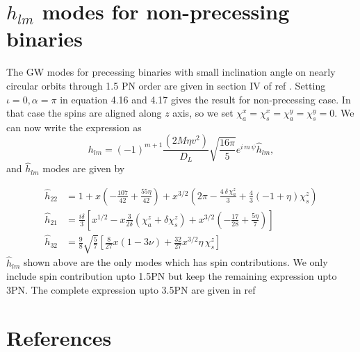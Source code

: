 \documentclass[prd,preprintnumbers,twocolumn,eqsecnum,floatfix,letter]{revtex4}
\begin{document}
\section{$h_{lm}$ modes for non-precessing binaries}\label{Appendix:D}
The GW modes for precessing binaries with small inclination angle on nearly circular orbits through 1.5 PN order are given in section IV of ref \cite{Arun2009}. Setting $\iota = 0, \alpha = \pi$ in equation 4.16 and 4.17 gives the result for non-precessing case. In that case the spins are aligned along $z$ axis, so we set $\chi_a^x=\chi_s^x=\chi_a^y=\chi_s^y=0$. We can now write the expression as 
\begin{equation}
	h_{lm} = (-1)^{m+1}\frac{(2M\eta v^2)}{D_L}\sqrt{\frac{16\pi}{5}}e^{\mathit{i}\,m\,\psi}\hat{h}_{lm},
\end{equation}
and $\hat{h}_{lm}$ modes are given by 

\begin{subequations}
\begin{align}
	\hat{h}_{22} &= 1 + x\left(-\frac{107}{42} + \frac{55\eta}{42}\right) + x^{3/2}\left(2\pi - \frac{4\,\delta\,\chi^{z}_{a}}{3} + \frac{4}{3}\left(-1+\eta\right)\chi^z_s\right)\\
	\hat{h}_{21} &= \frac{\mathit{i}\delta}{3}\left[x^{1/2} - x\frac{3}{2\delta}\left(\chi^{z}_{a} + \delta\chi^{z}_{s}\right) + x^{3/2}\left(-\frac{17}{28} + \frac{5\eta}{7}\right)\right]\\
	\hat{h}_{32} &= \frac{9}{8}\sqrt{\frac{5}{7}}\left[\frac{8}{27}x\left(1-3\nu\right) + \frac{32}{27}x^{3/2}\eta\,\chi^z_s\right]
\end{align}
\end{subequations}
$\hat{h}_{lm}$ shown above are the only modes which has spin contributions. We only include spin contribution upto 1.5PN but keep the remaining expression upto 3PN. The complete expression upto 3.5PN are given in ref \cite{Blanchet_Iyer2008}
\section*{References}



\end{document}
